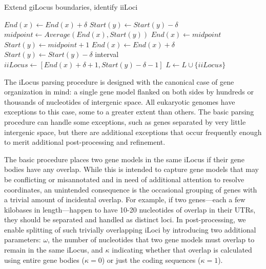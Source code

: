 \begin{algorithm}
\caption{Extend giLocus boundaries, identify iiLoci}
\label{Alg:ExtendIntervals}
\begin{algorithmic}[1]
    \State $\textit{End}(x) \gets \textit{End}(x) + \delta$
    \State $\textit{Start}(y) \gets \textit{Start}(y) - \delta$
    \State $\textit{midpoint} \gets \textit{Average}\left(\textit{End}(x), \textit{Start}(y)\right)$
    \State $\textit{End}(x) \gets \textit{midpoint}$
    \State $\textit{Start}(y) \gets \textit{midpoint} + 1$
\Else
    \State $\textit{End}(x) \gets \textit{End}(x) + \delta$
    \State $\textit{Start}(y) \gets \textit{Start}(y) - \delta$
    \State interval $iiLocus \gets [ \textit{End}(x)+\delta+1, \textit{Start}(y)-\delta-1 ]$
    \State $L \gets L \cup \{ iiLocus \}$
\EndIf
\EndFor
\EndProcedure
\end{algorithmic}
\end{algorithm}

The iLocus parsing procedure is designed with the canonical case of gene organization in mind: a single gene model flanked on both sides by hundreds or thousands of nucleotides of intergenic space.
All eukaryotic genomes have exceptions to this case, some to a greater extent than others.
The basic parsing procedure can handle some exceptions, such as genes separated by very little intergenic space, but there are additional exceptions that occur frequently enough to merit additional post-processing and refinement.

The basic procedure places two gene models in the same iLocus if their gene bodies have any overlap.
While this is intended to capture gene models that may be conflicting or misannotated and in need of additional attention to resolve coordinates, an unintended consequence is the occasional grouping of genes with a trivial amount of incidental overlap.
For example, if two genes---each a few kilobases in length---happen to have 10-20 nucleotides of overlap in their UTRs, they should be separated and handled as distinct loci.
In post-processing, we enable splitting of such trivially overlapping iLoci by introducing two additional parameters: $\omega$, the number of nucleotides that two gene models must overlap to remain in the same iLocus, and $\kappa$ indicating whether that overlap is calculated using entire gene bodies ($\kappa = 0$) or just the coding sequences ($\kappa = 1$).

